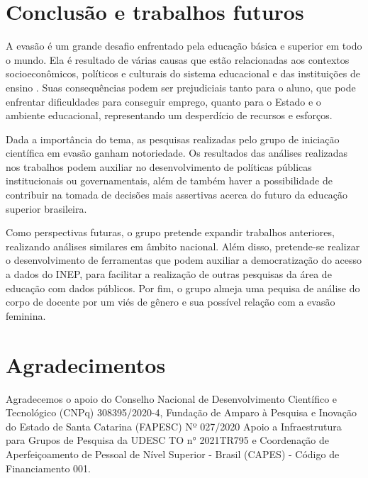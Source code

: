 \documentclass[12pt]{article}
\begin{document}
\section{Conclusão e trabalhos futuros}

A evasão é um grande desafio enfrentado pela educação básica e superior em todo o mundo. Ela é resultado de várias causas que estão relacionadas aos contextos socioeconômicos, políticos e culturais do sistema educacional e das instituições de ensino \cite{silva:2019}. Suas consequências podem ser prejudiciais tanto para o aluno, que pode enfrentar dificuldades para conseguir emprego, quanto para o Estado e o ambiente educacional, representando um desperdício de recursos e esforços.

Dada a importância do tema, as pesquisas realizadas pelo grupo de iniciação científica em evasão ganham notoriedade. Os resultados das análises realizadas nos trabalhos podem auxiliar no desenvolvimento de políticas públicas institucionais ou governamentais, além de também haver a possibilidade de contribuir na tomada de decisões mais assertivas acerca do futuro da educação superior brasileira.

Como perspectivas futuras, o grupo pretende expandir trabalhos anteriores, realizando análises similares em âmbito nacional. Além disso, pretende-se realizar o desenvolvimento de ferramentas que podem auxiliar a democratização do acesso a dados do INEP, para facilitar a realização de outras pesquisas da área de educação com dados públicos. Por fim, o grupo almeja uma pequisa de análise do corpo de docente por um viés de gênero e sua possível relação com a evasão feminina.  

\section{Agradecimentos}

Agradecemos o apoio do Conselho Nacional de Desenvolvimento Científico e Tecnológico (CNPq) 308395/2020-4,  Fundação de Amparo à Pesquisa e Inovação do Estado de Santa Catarina (FAPESC) Nº 027/2020 Apoio a Infraestrutura para Grupos de Pesquisa da UDESC TO n° 2021TR795 e Coordenação de Aperfeiçoamento de Pessoal de Nível Superior - Brasil (CAPES) - Código de Financiamento 001.





\end{document}
